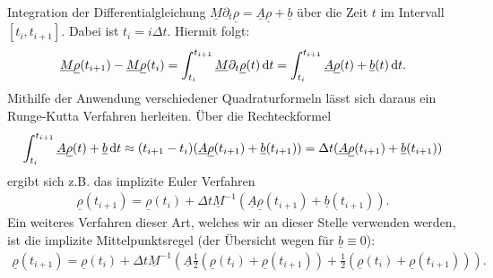 Integration der Differentialgleichung $\underline{M} \partial_t \underline{\rho} = \underline{A} \underline{\rho} + \underline{b}$ über die Zeit $t$ im Intervall $[t_i, t_{i+1}]$.
Dabei ist $t_i = i \Delta t$. Hiermit folgt:
\begin{align*}
\underline{M}\underline{\rho}(t_{i+1}) - \underline{M}\underline{\rho}(t_i) = \int_{t_i}^{t_{i+1}}
\underline{M} \partial_t \underline{\rho}(t) \, \mathrm{d} t =\int_{t_i}^{t_{i+1}} \underline{A} \underline{\rho}(t) + \underline{b}(t) \, \mathrm{d} t.
\end{align*}
Mithilfe der Anwendung verschiedener Quadraturformeln lässt sich daraus ein Runge-Kutta Verfahren herleiten. Über die Rechteckformel 
\begin{align*}
\int_{t_i}^{t_{i+1}}\underline{A} \underline{\rho}(t) + \underline{b} \, \mathrm{d} t \approx (t_{i+1}-t_i)( 
\underline{A} \underline{\rho}(t_{i+1}) + \underline{b}(t_{i+1})) = \Delta t (\underline{A} \underline{\rho}(t_{i+1}) + \underline{b}(t_{i+1}))
\end{align*}
ergibt sich z.B. das implizite Euler Verfahren
\begin{align*}
\underline{\rho}(t_{i+1}) = \underline{\rho}(t_{i}) + \Delta t \underline{M}^{-1}(\underline{A} \underline{\rho}(t_{i+1}) + \underline{b}(t_{i+1})).
\end{align*}
Ein weiteres Verfahren dieser Art, welches wir an dieser Stelle verwenden werden, ist die implizite Mittelpunktsregel (der Übersicht wegen für $\underline{b} \equiv 0$):
\begin{align*}
\underline{\rho}(t_{i+1}) = \underline{\rho}(t_{i}) +
\Delta t \underline{M}^{-1} (
\underline{A} 
\frac{1}{2}(\underline{\rho}(t_{i}) +
\underline{\rho}(t_{i+1}) )
+
\frac{1}{2} ( \underline{\rho}(t_{i}) +
\underline{\rho}(t_{i+1}) )).
\end{align*}

